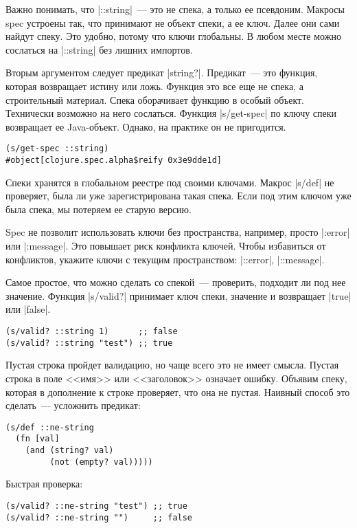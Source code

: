Важно понимать, что \spverb|::string|~--- это не спека, а только ее
псевдоним. Макросы spec устроены так, что принимают не объект спеки, а ее
ключ. Далее они сами найдут спеку. Это удобно, потому что ключи глобальны. В
любом месте можно сослаться на \spverb|::string| без лишних импортов.

Вторым аргументом следует предикат \spverb|string?|. Предикат~--- это функция,
которая возвращает истину или ложь. Функция это все еще не спека, а строительный
материал. Спека оборачивает функцию в особый объект. Технически возможно на него
сослаться. Функция \spverb|s/get-spec| по ключу спеки возвращает ее
Java-объект. Однако, на практике он не пригодится.

\begin{verbatim}
(s/get-spec ::string)
#object[clojure.spec.alpha$reify 0x3e9dde1d]
\end{verbatim}

Спеки хранятся в глобальном реестре под своими ключами. Макрос \spverb|s/def| не
проверяет, была ли уже зарегистрирована такая спека. Если под этим ключом уже
была спека, мы потеряем ее старую версию.

Spec не позволит использовать ключи без пространства, например, просто
\spverb|:error| или \spverb|:message|. Это повышает риск конфликта ключей. Чтобы
избавиться от конфликтов, укажите ключи с текущим пространством:
\spverb|::error|, \spverb|::message|.

Самое простое, что можно сделать со спекой~--- проверить, подходит ли под нее
значение. Функция \spverb|s/valid?| принимает ключ спеки, значение и возвращает
\spverb|true| или \spverb|false|.

\begin{verbatim}
(s/valid? ::string 1)      ;; false
(s/valid? ::string "test") ;; true
\end{verbatim}

Пустая строка пройдет валидацию, но чаще всего это не имеет смысла. Пустая
строка в поле <<имя>> или <<заголовок>> означает ошибку. Объявим спеку, которая
в дополнение к строке проверяет, что она не пустая. Наивный способ это
сделать~--- усложнить предикат:

\begin{verbatim}
(s/def ::ne-string
  (fn [val]
    (and (string? val)
         (not (empty? val)))))
\end{verbatim}

\noindent
Быстрая проверка:

\begin{verbatim}
(s/valid? ::ne-string "test") ;; true
(s/valid? ::ne-string "")     ;; false
\end{verbatim}

